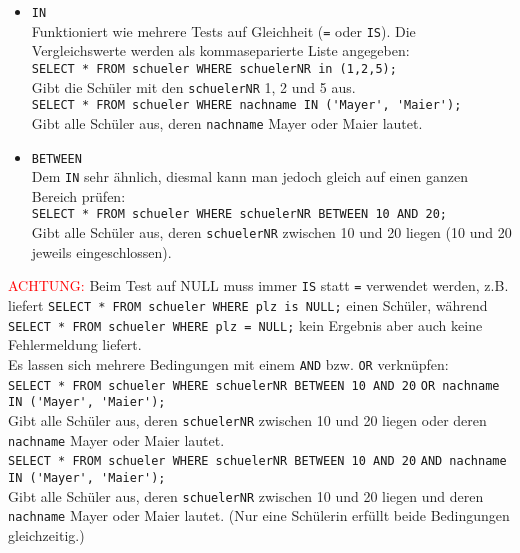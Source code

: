\begin{itemize}
	\item \lstinline!IN!\\
	Funktioniert wie mehrere Tests auf Gleichheit (\lstinline!=! oder \lstinline!IS!). Die Vergleichswerte werden als kommaseparierte Liste angegeben:\\
	\lstinline!SELECT * FROM schueler WHERE schuelerNR in (1,2,5);!\\
	Gibt die Schüler mit den \lstinline!schuelerNR! 1, 2 und 5 aus.\\
	\lstinline!SELECT * FROM schueler WHERE nachname IN ('Mayer', 'Maier');!\\
	Gibt alle Schüler aus, deren \lstinline!nachname! Mayer oder Maier lautet.
	\item \lstinline!BETWEEN!\\
	Dem \lstinline!IN! sehr ähnlich, diesmal kann man jedoch gleich auf einen ganzen Bereich prüfen:\\
	\lstinline!SELECT * FROM schueler WHERE schuelerNR BETWEEN 10 AND 20;!\\
	Gibt alle Schüler aus, deren \lstinline!schuelerNR! zwischen 10 und 20 liegen (10 und 20 jeweils eingeschlossen).
\end{itemize}
\textcolor{red}{ACHTUNG:} Beim Test auf NULL muss immer \lstinline!IS! statt \lstinline!=! verwendet werden, z.B. liefert \lstinline!SELECT * FROM schueler WHERE plz is NULL;! einen Schüler, während \lstinline!SELECT * FROM schueler WHERE plz = NULL;! kein Ergebnis aber auch keine Fehlermeldung liefert.\\
Es lassen sich mehrere Bedingungen mit einem \lstinline!AND! bzw. \lstinline!OR! verknüpfen:\\
\lstinline!SELECT * FROM schueler WHERE schuelerNR BETWEEN 10 AND 20!
\lstinline!OR nachname IN ('Mayer', 'Maier');!\\
Gibt alle Schüler aus, deren \lstinline!schuelerNR! zwischen 10 und 20 liegen oder deren \lstinline!nachname! Mayer oder Maier lautet.\\
\lstinline!SELECT * FROM schueler WHERE schuelerNR BETWEEN 10 AND 20!
\lstinline!AND nachname IN ('Mayer', 'Maier');!\\
Gibt alle Schüler aus, deren \lstinline!schuelerNR! zwischen 10 und 20 liegen und deren \lstinline!nachname! Mayer oder Maier lautet. (Nur eine Schülerin erfüllt beide Bedingungen gleichzeitig.)\\

